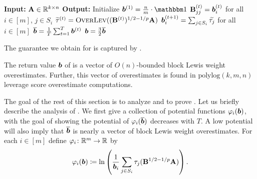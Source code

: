 \documentclass[11pt]{article}
\numberwithin{equation}{section}
\begin{document}
\begin{algorithm}[H]
\caption{Algorithm to compute block Lewis weight overestimates, $p \ge 2$}
\begin{algorithmic}[1]\label{alg:blw}
\State \textbf{Input:} \(\mathbf{A} \in \mathbb{R}^{k \times n}\)
\State \textbf{Output:}
\State Initialize \(\vb^{(1)} = \frac{n}{m} \cdot \onev\) \label{line:alg_init}
    \State \(\mathbf{B}^{(t)}_{jj} = \bm{b}^{(t)}_i\) for all \(i \in [m]\), \(j \in S_i\)
    \State \(\widetilde{\tau}^{(t)} = \textsc{OverLev}((\mathbf{B}^{(t)})^{1/2 - 1/p} \mathbf{A})\)\label{line:alg_iter_lev}
    \State \(\bm{b}^{(t+1)}_i = \sum_{j \in S_i} \widetilde{\tau_j}\) for all \(i \in [m]\)\label{line:alg_iter_next}
\EndFor
\State \(\overline{\bm{b}} = \frac{1}{T} \sum_{t=1}^T \bm{b}^{(t)}\)
\State \Return \(\bm{b} = \frac{3}{2} \overline{\bm{b}}\)
\end{algorithmic}
\end{algorithm}

The guarantee we obtain for  is captured by .

\begin{lemma}
\label{thm:blw}
The return value \(\bm{b}\) of   is a vector of \(O(n)\)-bounded block Lewis weight overestimates.
Further, this vector of overestimates is found in \(\text{polylog}(k, m, n)\) leverage score overestimate computations.
\end{lemma}

The goal of the rest of this section is to analyze  and to prove . Let us briefly describe the analysis of . We first give a collection of potential functions \(\varphi_i(\bm{b})\), with the goal of showing the potential of \(\varphi_i(\overline{\bm{b}})\) decreases with \(T\). A low potential will also imply that \(\overline{\bm{b}}\) is nearly a vector of block Lewis weight overestimates.
For each \(i \in [m]\) define \(\varphi_i \colon \mathbb{R}^m \rightarrow \mathbb{R}\) by
\[\varphi_i(\bm{b}) \coloneqq \ln\left(\frac{1}{\bm{b}_i} \sum_{j \in S_i} \tau_j(\mathbf{B}^{1/2 - 1/p} \mathbf{A})\right).\]
\end{document}
